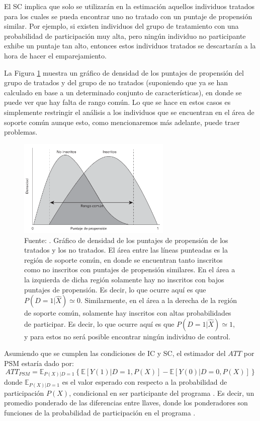 \documentclass[../../main.tex]{subfiles}
\begin{document}
El SC implica que solo se utilizarán en la estimación aquellos individuos tratados para
los cuales se pueda encontrar uno no tratado con un puntaje de propensión similar. Por
ejemplo, si existen individuos del grupo de tratamiento con una probabilidad de
participación muy alta, pero ningún individuo no participante exhibe un puntaje tan alto,
entonces estos individuos tratados se descartarán a la hora de hacer el emparejamiento.

La Figura \ref{fig:common-support} muestra un gráfico de densidad de los puntajes de
propensión del grupo de tratados y del grupo de no tratados (suponiendo que ya se han
calculado en base a un determinado conjunto de características), en donde se puede ver que
hay falta de rango común. Lo que se hace en estos casos es simplemente restringir el
análisis a los individuos que se encuentran en el área de soporte común aunque esto, como
mencionaremos más adelante, puede traer problemas.

\begin{figure}[h!]
    \centering
    \includegraphics[width=0.65\textwidth]{figs/soporte-comun.png}
    \caption{Fuente: \cite{gertler-2016}. Gráfico de densidad de los puntajes de
    propensión de los tratados y los no tratados. El área entre las líneas punteadas es la
    región de soporte común, en donde se encuentran tanto inscritos como no inscritos con
    puntajes de propensión similares. En el área a la izquierda de dicha región solamente
    hay no inscritos con bajos puntajes de propensión. Es decir, lo que ocurre aquí es que
    \(P(D=1|\hat{X}) \simeq 0\). Similarmente, en el área a la derecha de la región de
    soporte común, solamente hay inscritos con altas probabilidades de participar. Es
    decir, lo que ocurre aquí es que \(P(D=1|\hat{X}) \simeq 1\), y para estos no será
    posible encontrar ningún individuo de control.}
    \label{fig:common-support}
\end{figure}

Asumiendo que se cumplen las condiciones de IC y SC, el estimador del \(ATT\) por PSM
estaría dado por:
\begin{equation}
ATT_{PSM} = \mathbb{E}_{P(X)|D=1}
    \left\{
        \mathbb{E}\left[Y(1)|D=1, P(X)\right] - \mathbb{E}\left[Y(0)|D=0, P(X)\right]
    \right\}
    \label{ATT-PSM}
\end{equation}
donde \(\mathbb{E}_{P(X)|D=1}\) es el valor esperado con respecto a la probabilidad de
participación \(P(X)\), condicional en ser participante del programa \cite{bernal}. Es
decir, un promedio ponderado de las diferencias entre llaves, donde los ponderadores
son funciones de la probabilidad de participación en el programa \cite{bernal}.
\end{document}
